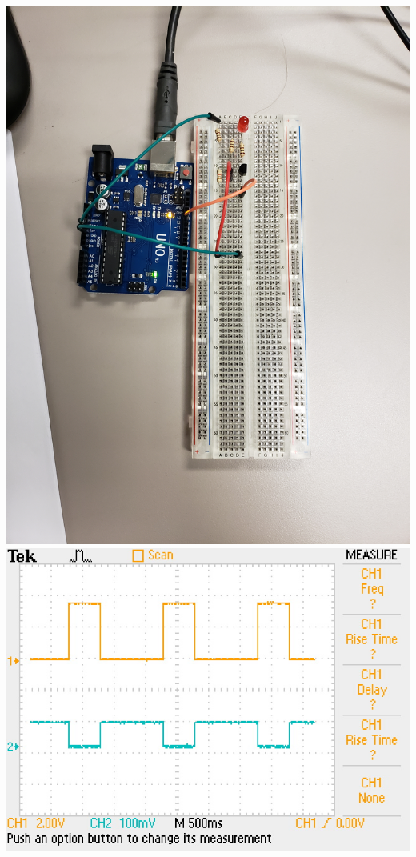 \documentclass[12pt]{article}
\begin{document}
\begin{center}
					\includegraphics[scale=0.03]{transistor.jpg}\\
					\vspace{1cm}
					\includegraphics[scale=0.5]{otransistor.jpg}\\
				\end{center}
\end{document}
